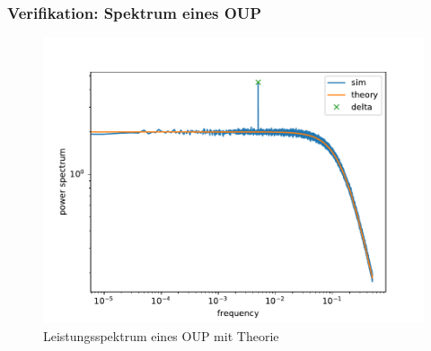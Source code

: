 \documentclass[12pt,a4paper]{article}
\begin{document}
\subsubsection{Verifikation: Spektrum eines OUP}
\begin{figure}[H]
	\centering
	\includegraphics[scale=1]{oup2jtheo3.pdf}\caption{Leistungsspektrum eines OUP mit Theorie}
	\label{oupsp}
\end{figure}
\end{document}
